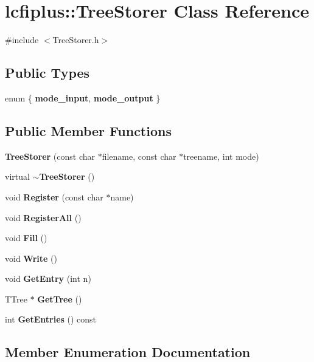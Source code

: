 \section{lcfiplus\-:\-:Tree\-Storer Class Reference}
\label{classlcfiplus_1_1TreeStorer}


{\ttfamily \#include $<$Tree\-Storer.\-h$>$}

\subsection*{Public Types}
\begin{DoxyCompactItemize}
\item 
enum \{ {\bf mode\-\_\-input}, 
{\bf mode\-\_\-output}
 \}
\end{DoxyCompactItemize}
\subsection*{Public Member Functions}
\begin{DoxyCompactItemize}
\item 
{\bf Tree\-Storer} (const char $\ast$filename, const char $\ast$treename, int mode)
\item 
virtual {\bf $\sim$\-Tree\-Storer} ()
\item 
void {\bf Register} (const char $\ast$name)
\item 
void {\bf Register\-All} ()
\item 
void {\bf Fill} ()
\item 
void {\bf Write} ()
\item 
void {\bf Get\-Entry} (int n)
\item 
T\-Tree $\ast$ {\bf Get\-Tree} ()
\item 
int {\bf Get\-Entries} () const 
\end{DoxyCompactItemize}


\subsection{Member Enumeration Documentation}
